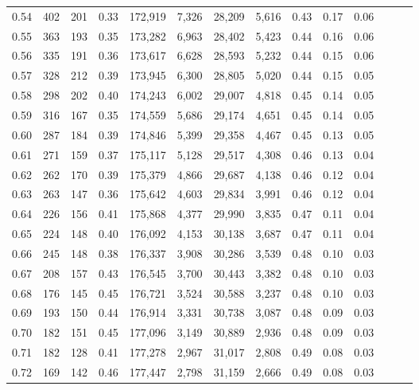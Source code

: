 \begin{tabular}{rrrrrrrrrrrrrr}
0.54 &    402 &  201 &  0.33 &  172,919 &    7,326 &  28,209 &   5,616 &  0.43 &  0.17 &      0.06 \\
0.55 &    363 &  193 &  0.35 &  173,282 &    6,963 &  28,402 &   5,423 &  0.44 &  0.16 &      0.06 \\
0.56 &    335 &  191 &  0.36 &  173,617 &    6,628 &  28,593 &   5,232 &  0.44 &  0.15 &      0.06 \\
0.57 &    328 &  212 &  0.39 &  173,945 &    6,300 &  28,805 &   5,020 &  0.44 &  0.15 &      0.05 \\
0.58 &    298 &  202 &  0.40 &  174,243 &    6,002 &  29,007 &   4,818 &  0.45 &  0.14 &      0.05 \\
0.59 &    316 &  167 &  0.35 &  174,559 &    5,686 &  29,174 &   4,651 &  0.45 &  0.14 &      0.05 \\
0.60 &    287 &  184 &  0.39 &  174,846 &    5,399 &  29,358 &   4,467 &  0.45 &  0.13 &      0.05 \\
0.61 &    271 &  159 &  0.37 &  175,117 &    5,128 &  29,517 &   4,308 &  0.46 &  0.13 &      0.04 \\
0.62 &    262 &  170 &  0.39 &  175,379 &    4,866 &  29,687 &   4,138 &  0.46 &  0.12 &      0.04 \\
0.63 &    263 &  147 &  0.36 &  175,642 &    4,603 &  29,834 &   3,991 &  0.46 &  0.12 &      0.04 \\
0.64 &    226 &  156 &  0.41 &  175,868 &    4,377 &  29,990 &   3,835 &  0.47 &  0.11 &      0.04 \\
0.65 &    224 &  148 &  0.40 &  176,092 &    4,153 &  30,138 &   3,687 &  0.47 &  0.11 &      0.04 \\
0.66 &    245 &  148 &  0.38 &  176,337 &    3,908 &  30,286 &   3,539 &  0.48 &  0.10 &      0.03 \\
0.67 &    208 &  157 &  0.43 &  176,545 &    3,700 &  30,443 &   3,382 &  0.48 &  0.10 &      0.03 \\
0.68 &    176 &  145 &  0.45 &  176,721 &    3,524 &  30,588 &   3,237 &  0.48 &  0.10 &      0.03 \\
0.69 &    193 &  150 &  0.44 &  176,914 &    3,331 &  30,738 &   3,087 &  0.48 &  0.09 &      0.03 \\
0.70 &    182 &  151 &  0.45 &  177,096 &    3,149 &  30,889 &   2,936 &  0.48 &  0.09 &      0.03 \\
0.71 &    182 &  128 &  0.41 &  177,278 &    2,967 &  31,017 &   2,808 &  0.49 &  0.08 &      0.03 \\
0.72 &    169 &  142 &  0.46 &  177,447 &    2,798 &  31,159 &   2,666 &  0.49 &  0.08 &      0.03 \\

\end{tabular}

